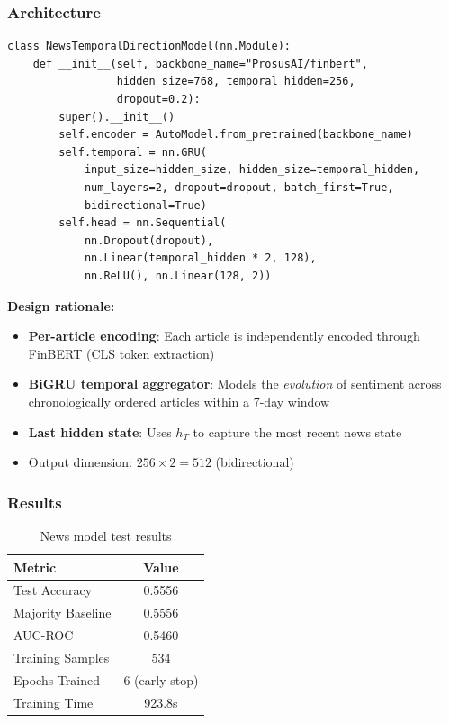 \documentclass[12pt,a4paper]{article}
\begin{document}
\subsubsection{Architecture}

\begin{lstlisting}[caption={NewsTemporalDirectionModel (\texttt{src/models/news\_model.py})}]
class NewsTemporalDirectionModel(nn.Module):
    def __init__(self, backbone_name="ProsusAI/finbert",
                 hidden_size=768, temporal_hidden=256,
                 dropout=0.2):
        super().__init__()
        self.encoder = AutoModel.from_pretrained(backbone_name)
        self.temporal = nn.GRU(
            input_size=hidden_size, hidden_size=temporal_hidden,
            num_layers=2, dropout=dropout, batch_first=True,
            bidirectional=True)
        self.head = nn.Sequential(
            nn.Dropout(dropout),
            nn.Linear(temporal_hidden * 2, 128),
            nn.ReLU(), nn.Linear(128, 2))
\end{lstlisting}

\textbf{Design rationale:}
\begin{itemize}[noitemsep]
    \item \textbf{Per-article encoding}: Each article is independently encoded through FinBERT (CLS token extraction)
    \item \textbf{BiGRU temporal aggregator}: Models the \emph{evolution} of sentiment across chronologically ordered articles within a 7-day window
    \item \textbf{Last hidden state}: Uses $h_T$ to capture the most recent news state
    \item Output dimension: $256 \times 2 = 512$ (bidirectional)
\end{itemize}

\subsubsection{Results}

\begin{table}[H]
\centering
\begin{tabular}{lc}
\toprule
\textbf{Metric} & \textbf{Value} \\
\midrule
Test Accuracy & 0.5556 \\
Majority Baseline & 0.5556 \\
AUC-ROC & 0.5460 \\
Training Samples & 534 \\
Epochs Trained & 6 (early stop) \\
Training Time & 923.8s \\
\bottomrule
\end{tabular}
\caption{News model test results}
\label{tab:news_results}
\end{table}
\end{document}
